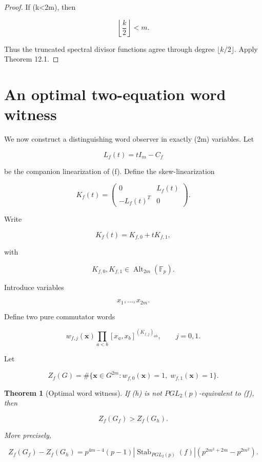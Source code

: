 \documentclass[11pt]{article}
\newtheorem{theorem}{Theorem}[section]
\begin{document}
\begin{proof}
If (k<2m), then

\[
\left\lfloor\frac k2\right\rfloor<m.
\]

Thus the truncated spectral divisor functions agree through degree $\lfloor k/2\rfloor$. Apply Theorem 12.1.

\end{proof}

\section{An optimal two-equation word witness}

We now construct a distinguishing word observer in exactly (2m) variables. Let

\[
L_f(t)=tI_m-C_f
\]

be the companion linearization of (f). Define the skew-linearization

\[
K_f(t)=
\begin{pmatrix}
0 & L_f(t)\\
-L_f(t)^T & 0
\end{pmatrix}.
\tag{15.1}
\]

Write

\[
K_f(t)=K_{f,0}+tK_{f,1},
\]

with

\[
K_{f,0},K_{f,1}\in\operatorname{Alt}_{2m}(\mathbb F_p).
\]

Introduce variables

\[
x_1,\ldots,x_{2m}.
\]

Define two pure commutator words

\[
w_{f,j}(\mathbf x)
\prod_{a<b}
[x_a,x_b]^{(K_{f,j})_{ab}},
\qquad
j=0,1.
\tag{15.2}
\]

Let

\[
Z_f(G)
=\#\{\mathbf x\in G^{2m}: w_{f,0}(\mathbf x)=1,\; w_{f,1}(\mathbf x)=1\}.
\]

\begin{theorem}[Optimal word witness]
If (h) is not $PGL_2(p)$-equivalent to (f), then

\[
Z_f(G_f)>Z_f(G_h).
\]

More precisely,

\[
Z_f(G_f)-Z_f(G_h)
=p^{4m-4}
(p-1)
|\operatorname{Stab}_{PGL_2(p)}(f)|
\left(
p^{2m^2+2m}-p^{2m^2}
\right).
\tag{15.3}
\]

\end{theorem}
\end{document}
